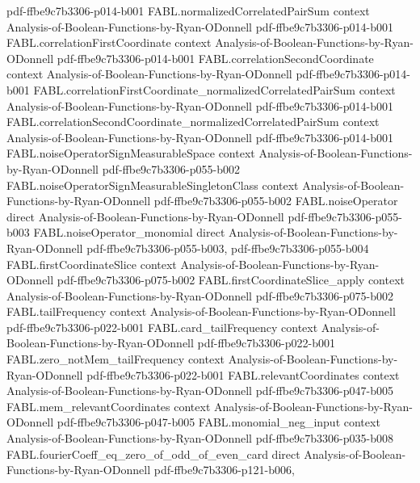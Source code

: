 \begin{theorem}
  {pdf-ffbe9c7b3306-p014-b001}
\proofstep
  {FABL.normalizedCorrelatedPairSum}
  {context}
  {Analysis-of-Boolean-Functions-by-Ryan-ODonnell}
  {pdf-ffbe9c7b3306-p014-b001}
\proofstep
  {FABL.correlationFirstCoordinate}
  {context}
  {Analysis-of-Boolean-Functions-by-Ryan-ODonnell}
  {pdf-ffbe9c7b3306-p014-b001}
\proofstep
  {FABL.correlationSecondCoordinate}
  {context}
  {Analysis-of-Boolean-Functions-by-Ryan-ODonnell}
  {pdf-ffbe9c7b3306-p014-b001}
\proofstep
  {FABL.correlationFirstCoordinate_normalizedCorrelatedPairSum}
  {context}
  {Analysis-of-Boolean-Functions-by-Ryan-ODonnell}
  {pdf-ffbe9c7b3306-p014-b001}
\proofstep
  {FABL.correlationSecondCoordinate_normalizedCorrelatedPairSum}
  {context}
  {Analysis-of-Boolean-Functions-by-Ryan-ODonnell}
  {pdf-ffbe9c7b3306-p014-b001}
\proofstep
  {FABL.noiseOperatorSignMeasurableSpace}
  {context}
  {Analysis-of-Boolean-Functions-by-Ryan-ODonnell}
  {pdf-ffbe9c7b3306-p055-b002}
\proofstep
  {FABL.noiseOperatorSignMeasurableSingletonClass}
  {context}
  {Analysis-of-Boolean-Functions-by-Ryan-ODonnell}
  {pdf-ffbe9c7b3306-p055-b002}
\proofstep
  {FABL.noiseOperator}
  {direct}
  {Analysis-of-Boolean-Functions-by-Ryan-ODonnell}
  {pdf-ffbe9c7b3306-p055-b003}
\proofstep
  {FABL.noiseOperator_monomial}
  {direct}
  {Analysis-of-Boolean-Functions-by-Ryan-ODonnell}
  {pdf-ffbe9c7b3306-p055-b003,
    pdf-ffbe9c7b3306-p055-b004}
\proofstep
  {FABL.firstCoordinateSlice}
  {context}
  {Analysis-of-Boolean-Functions-by-Ryan-ODonnell}
  {pdf-ffbe9c7b3306-p075-b002}
\proofstep
  {FABL.firstCoordinateSlice_apply}
  {context}
  {Analysis-of-Boolean-Functions-by-Ryan-ODonnell}
  {pdf-ffbe9c7b3306-p075-b002}
\proofstep
  {FABL.tailFrequency}
  {context}
  {Analysis-of-Boolean-Functions-by-Ryan-ODonnell}
  {pdf-ffbe9c7b3306-p022-b001}
\proofstep
  {FABL.card_tailFrequency}
  {context}
  {Analysis-of-Boolean-Functions-by-Ryan-ODonnell}
  {pdf-ffbe9c7b3306-p022-b001}
\proofstep
  {FABL.zero_notMem_tailFrequency}
  {context}
  {Analysis-of-Boolean-Functions-by-Ryan-ODonnell}
  {pdf-ffbe9c7b3306-p022-b001}
\proofstep
  {FABL.relevantCoordinates}
  {context}
  {Analysis-of-Boolean-Functions-by-Ryan-ODonnell}
  {pdf-ffbe9c7b3306-p047-b005}
\proofstep
  {FABL.mem_relevantCoordinates}
  {context}
  {Analysis-of-Boolean-Functions-by-Ryan-ODonnell}
  {pdf-ffbe9c7b3306-p047-b005}
\proofstep
  {FABL.monomial_neg_input}
  {context}
  {Analysis-of-Boolean-Functions-by-Ryan-ODonnell}
  {pdf-ffbe9c7b3306-p035-b008}
\proofstep
  {FABL.fourierCoeff_eq_zero_of_odd_of_even_card}
  {direct}
  {Analysis-of-Boolean-Functions-by-Ryan-ODonnell}
  {pdf-ffbe9c7b3306-p121-b006,
}
\end{theorem}
